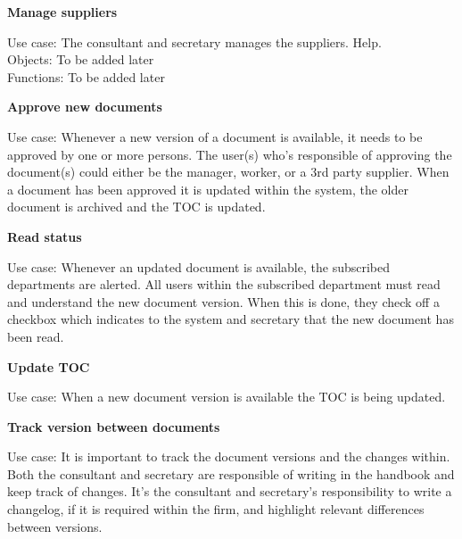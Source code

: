 \textbf{Manage suppliers}

Use case: The consultant and secretary manages the suppliers. Help.
\\
Objects: To be added later
\\
Functions: To be added later

\textbf{Approve new documents}

Use case: Whenever a new version of a document is available, it needs to be approved by one or more persons. The user(s) who’s responsible of approving the document(s) could either be the manager, worker, or a 3rd party supplier. When a document has been approved it is updated within the system, the older document is archived and the TOC is updated.

\textbf{Read status}

Use case: Whenever an updated document is available, the subscribed departments are alerted. All users within the subscribed department must read and understand the new document version. When this is done, they check off a checkbox which indicates to the system and secretary that the new document has been read.


\textbf{Update TOC}

Use case: When a new document version is available the TOC is being updated.

\textbf{Track version between documents}

Use case: It is important to track the document versions and the changes within. Both the consultant and secretary are responsible of writing in the handbook and keep track of changes. It’s the consultant and secretary’s responsibility to write a changelog, if it is required within the firm, and highlight relevant differences between versions.

